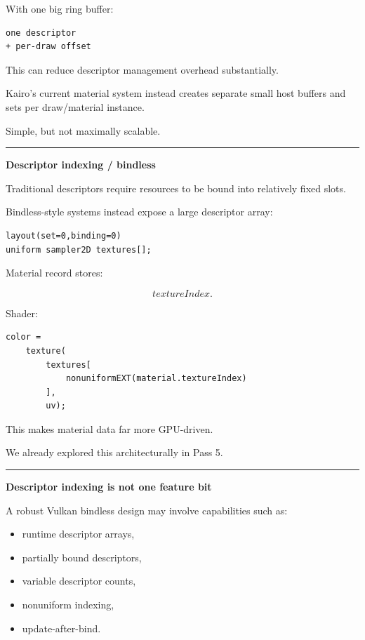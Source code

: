 With one big ring buffer:

\begin{verbatim}
one descriptor
+ per-draw offset
\end{verbatim}

This can reduce descriptor management overhead substantially.

Kairo's current material system instead creates separate small host buffers and sets per draw/material instance.

Simple, but not maximally scalable.

\begin{center}\rule{0.5\linewidth}{0.5pt}\end{center}

\textbf{Descriptor indexing / bindless}

Traditional descriptors require resources to be bound into relatively fixed slots.

Bindless-style systems instead expose a large descriptor array:

\begin{verbatim}
layout(set=0,binding=0)
uniform sampler2D textures[];
\end{verbatim}

Material record stores:

\[
textureIndex.
\]

Shader:

\begin{verbatim}
color =
    texture(
        textures[
            nonuniformEXT(material.textureIndex)
        ],
        uv);
\end{verbatim}

This makes material data far more GPU-driven.

We already explored this architecturally in Pass 5.

\begin{center}\rule{0.5\linewidth}{0.5pt}\end{center}

\textbf{Descriptor indexing is not one feature bit}

A robust Vulkan bindless design may involve capabilities such as:

\begin{itemize}
\tightlist
\item
  runtime descriptor arrays,
\item
  partially bound descriptors,
\item
  variable descriptor counts,
\item
  nonuniform indexing,
\item
  update-after-bind.
\end{itemize}

